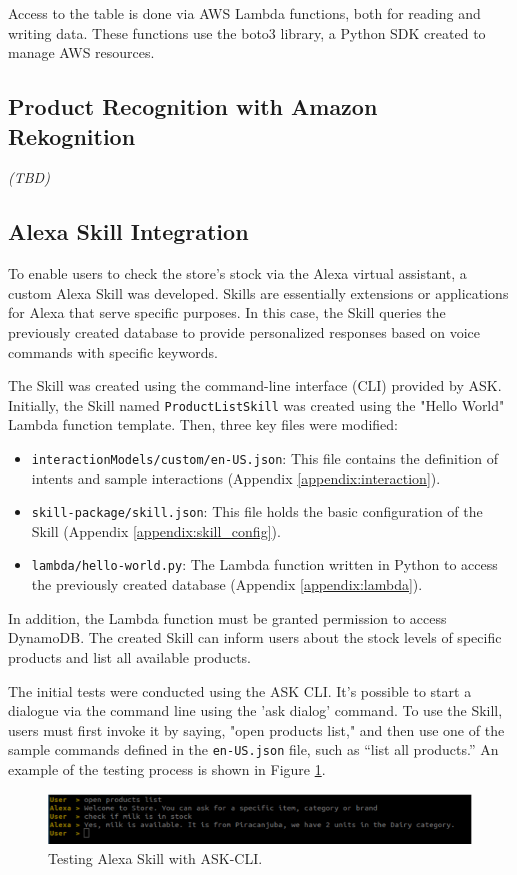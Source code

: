 Access to the table is done via AWS Lambda functions, both for reading and writing data. These functions use the boto3 library, a Python SDK created to manage AWS resources.

\subsection{Product Recognition with Amazon Rekognition}

\textit{(TBD)}

\subsection{Alexa Skill Integration}

To enable users to check the store's stock via the Alexa virtual assistant, a custom Alexa Skill was developed. Skills are essentially extensions or applications for Alexa that serve specific purposes. In this case, the Skill queries the previously created database to provide personalized responses based on voice commands with specific keywords.

The Skill was created using the command-line interface (CLI) provided by ASK. Initially, the Skill named \texttt{ProductListSkill} was created using the "Hello World" Lambda function template. Then, three key files were modified:

\begin{itemize} 
	\item \texttt{interactionModels/custom/en-US.json}: This file contains the definition of intents and sample interactions (Appendix \ref{appendix:interaction}). 
	\item \texttt{skill-package/skill.json}: This file holds the basic configuration of the Skill (Appendix \ref{appendix:skill_config}).
	\item \texttt{lambda/hello-world.py}: The Lambda function written in Python to access the previously created database (Appendix \ref{appendix:lambda}).
\end{itemize}

In addition, the Lambda function must be granted permission to access DynamoDB. The created Skill can inform users about the stock levels of specific products and list all available products.

The initial tests were conducted using the ASK CLI. It’s possible to start a dialogue via the command line using the 'ask dialog' command. To use the Skill, users must first invoke it by saying, "open products list," and then use one of the sample commands defined in the \texttt{en-US.json} file, such as “list all products.” An example of the testing process is shown in Figure \ref{ask-cli}.

\begin{figure}[h] 
	\centering \includegraphics[width=\textwidth]{images/ask-cli} 					\caption{Testing Alexa Skill with ASK-CLI.} 
	\label{ask-cli} 
\end{figure}

